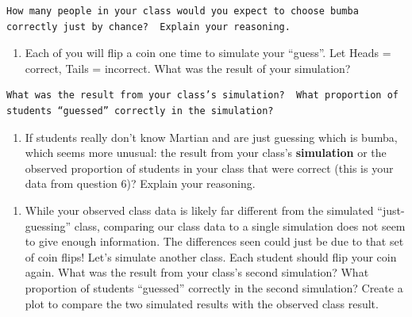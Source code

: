 \documentclass[
]{report}
\providecommand{\tightlist}{%
  \setlength{\itemsep}{0pt}\setlength{\parskip}{0pt}}
\begin{document}
\vspace{1in}

\begin{verbatim}
How many people in your class would you expect to choose bumba correctly just by chance?  Explain your reasoning.
\end{verbatim}

\vspace{1in}

\begin{enumerate}
\def\labelenumi{\arabic{enumi}.}
\setcounter{enumi}{9}
\tightlist
\item
  Each of you will flip a coin one time to simulate your ``guess''. Let Heads = correct, Tails = incorrect. What was the result of your simulation? \vspace{1in}
\end{enumerate}

\begin{verbatim}
What was the result from your class’s simulation?  What proportion of students “guessed” correctly in the simulation?
\end{verbatim}

\vspace{1in}

\begin{enumerate}
\def\labelenumi{\arabic{enumi}.}
\setcounter{enumi}{10}
\tightlist
\item
  If students really don't know Martian and are just guessing which is bumba, which seems more unusual: the result from your class's \textbf{simulation} or the observed proportion of students in your class that were correct (this is your data from question 6)? Explain your reasoning.
\end{enumerate}

\vspace{1in}

\begin{enumerate}
\def\labelenumi{\arabic{enumi}.}
\setcounter{enumi}{11}
\tightlist
\item
  While your observed class data is likely far different from the simulated ``just-guessing'' class, comparing our class data to a single simulation does not seem to give enough information. The differences seen could just be due to that set of coin flips! Let's simulate another class. Each student should flip your coin again. What was the result from your class's second simulation? What proportion of students ``guessed'' correctly in the second simulation? Create a plot to compare the two simulated results with the observed class result.
\end{enumerate}
\end{document}
